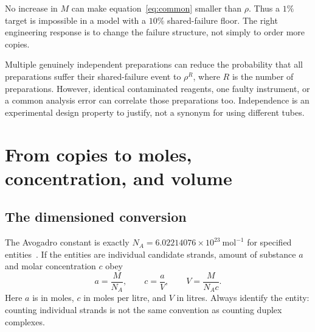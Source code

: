 
No increase in $M$ can make equation~\ref{eq:common} smaller than $\rho$. Thus a $1\%$ target is impossible in a model with a $10\%$ shared-failure floor. The right engineering response is to change the failure structure, not simply to order more copies.

Multiple genuinely independent preparations can reduce the probability that all preparations suffer their shared-failure event to $\rho^R$, where $R$ is the number of preparations. However, identical contaminated reagents, one faulty instrument, or a common analysis error can correlate those preparations too. Independence is an experimental design property to justify, not a synonym for using different tubes.

\section{From copies to moles, concentration, and volume}

\subsection{The dimensioned conversion}

The Avogadro constant is exactly $N_A=6.02214076\times10^{23}\ \mathrm{mol}^{-1}$ for specified entities~\cite{bipm}. If the entities are individual candidate strands, amount of substance $a$ and molar concentration $c$ obey
\begin{equation}
a=\frac{M}{N_A},\qquad c=\frac{a}{V},\qquad V=\frac{M}{N_Ac}. \label{eq:volume}
\end{equation}
Here $a$ is in moles, $c$ in moles per litre, and $V$ in litres. Always identify the entity: counting individual strands is not the same convention as counting duplex complexes.


